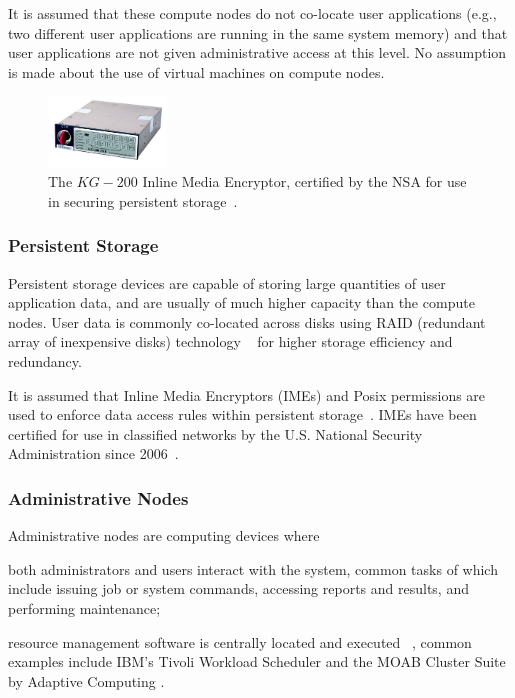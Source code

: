 \documentclass[oneside,12pt]{memoir}
\begin{document}
It is assumed that these compute nodes do not co-locate user applications (e.g., two different user applications are running in the same system memory) and that user applications are not given administrative access at this level. No assumption is made about the use of virtual machines on compute nodes.

\begin{figure}
  \begin{center}
    \includegraphics[width=0.28\textwidth]{inline_media_encryptor.jpg}
  \end{center}
  \caption{The $KG-200$ Inline Media Encryptor, certified by the NSA for use in securing persistent storage~\cite{nsa_ime_website}.}
\label{fig:inline_media_encryptor}
\end{figure}

\subsubsection{Persistent Storage}
Persistent storage devices are capable of storing large quantities of user application data, and are usually of much higher capacity than the compute nodes. User data is commonly co-located across disks using RAID (redundant array of inexpensive disks) technology ~\cite{katz1989disk} for higher storage efficiency and redundancy. 

It is assumed that Inline Media Encryptors (IMEs) and Posix permissions are used to enforce data access rules within persistent storage~\cite{nsa_ime}. IMEs have been certified for use in classified networks by the U.S. National Security Administration since 2006~\cite{nsa_ime_website}. 

\subsubsection{Administrative Nodes}
Administrative nodes are computing devices where \begin{inparaenum}
\item both administrators and users interact with the system, common tasks of which include issuing job or system commands, accessing reports and results, and performing maintenance;
\item resource management software is centrally located and executed ~\cite{keller2001anatomy}, common examples include IBM's Tivoli Workload Scheduler and the MOAB Cluster Suite by Adaptive Computing \cite{arackal2009access}\cite{jackson2006demand}.
\end{inparaenum}
\end{document}
